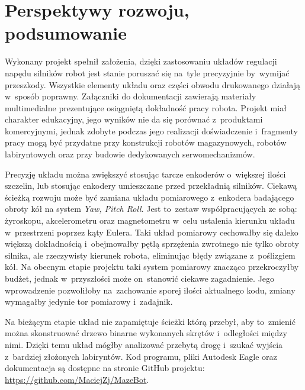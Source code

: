 \documentclass[11pt]{article}
\begin{document}
\section{Perspektywy rozwoju, podsumowanie}
Wykonany projekt spełnił założenia, dzięki zastosowaniu układów regulacji napędu silników robot jest stanie poruszać się na~tyle precyzyjnie by~wymijać przeszkody.
Wszystkie elementy układu oraz części obwodu drukowanego działają w~sposób poprawny.
Załączniki do dokumentacji zawierają materiały multimedialne prezentujące osiągniętą dokładność pracy robota.
Projekt miał charakter edukacyjny, jego wyników nie da się porównać z~produktami komercyjnymi, jednak zdobyte podczas jego realizacji doświadczenie i~fragmenty pracy mogą być przydatne przy konstrukcji robotów magazynowych, robotów labiryntowych oraz przy budowie dedykowanych serwomechanizmów.

Precyzję układu można zwiększyć stosując tarcze enkoderów o~większej ilości szczelin, lub stosując enkodery umieszczane przed przekładnią silników.
Ciekawą ścieżką rozwoju może być zamiana układu pomiarowego z~enkodera badającego obroty kół na system \textit{Yaw, Pitch Roll}.
Jest to~zestaw współpracujących ze sobą: żyroskopu, akcelerometru oraz magnetometru w~celu ustalenia kierunku układu w~przestrzeni poprzez kąty Eulera.
Taki układ pomiarowy cechowałby się daleko większą dokładnością i~obejmowałby pętlą sprzężenia zwrotnego nie tylko obroty silnika, ale rzeczywisty kierunek robota, eliminując błędy związane z~poślizgiem kół.
Na obecnym etapie projektu taki system pomiarowy znacząco przekroczyłby budżet, jednak w~przyszłości może on~stanowić ciekawe zagadnienie.
Jego wprowadzenie pozwoliłoby na~zachowanie sporej ilości aktualnego kodu, zmiany wymagałby jedynie tor pomiarowy i~zadajnik.

Na bieżącym etapie układ nie zapamiętuje ścieżki którą przebył, aby to~zmienić można skonstruować drzewo binarne wykonanych skrętów i~odległości między nimi.
Dzięki temu układ mógłby analizować przebytą drogę i~szukać wyjścia z~bardziej złożonych labiryntów.
Kod programu, pliki Autodesk Eagle oraz dokumentacja są dostępne na stronie GitHub projektu: \url{https://github.com/MaciejZj/MazeBot}.

\newpage
\listoftables
\listoffigures
\listoflistings
\newpage
\end{document}
